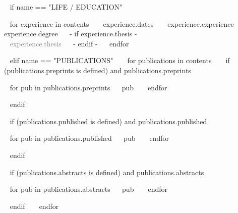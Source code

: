 

\medskip

\selectfont


\begin{minipage}{\textwidth}


~{ if name == "LIFE / EDUCATION" }~
  \begin{entrylist}
  ~{ for experience in contents }~
      \eduentry
        {~{{ experience.dates }}~} %
        {~{{ experience.experience }}~} %
        {} %
        {~{{ experience.degree }}~ 
        ~{- if experience.thesis -}~ \\ \textcolor{gray}{~{{ experience.thesis }}~} ~{- endif -}~
        } %
  ~{ endfor }~
  \end{entrylist}



~{ elif name == "PUBLICATIONS" }~
~{ for publications in contents }~
  ~{ if (publications.preprints is defined) and publications.preprints }~
  \begin{entrylist}[.1]
    ~{ for pub in publications.preprints}~
    \pubentry
      {~{{ pub }}~}
    ~{ endfor }~
  \end{entrylist}
  ~{ endif }~

  ~{ if (publications.published is defined) and publications.published }~
  \begin{entrylist}[.1]
    ~{ for pub in publications.published}~
    \pubentry
      {~{{ pub }}~}
    ~{ endfor }~
  \end{entrylist}
  ~{ endif }~

  ~{ if (publications.abstracts is defined) and publications.abstracts }~
  \begin{entrylist}[.1]
    ~{ for pub in publications.abstracts}~
    \pubentry
      {~{{ pub }}~}
    ~{ endfor }~
  \end{entrylist}
  ~{ endif }~
~{ endfor }~


\end{minipage}
